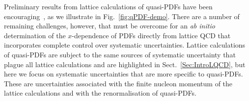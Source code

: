 Preliminary results from lattice calculations of quasi-PDFs have been encouraging~\cite{Lin:2014zya,Alexandrou:2015rja,Chen:2016utp,Alexandrou:2016jqi}, as we illustrate in Fig.~\ref{fig:qPDF-demo}. There are a number of remaining challenges, however, that must be overcome for an {\it ab initio} determination of the $x$-dependence of PDFs directly from lattice QCD that incorporates complete control over systematic uncertainties. Lattice calculations of quasi-PDFs are subject to the same sources of systematic uncertainty that plague all lattice calculations and are highlighted in Sect.~\ref{Sec:IntroLQCD}, but here we focus on systematic uncertainties that are more specific to quasi-PDFs. These are uncertainties associated with the finite nucleon momentum of the lattice calculations and with the renormalisation of quasi-PDFs.

